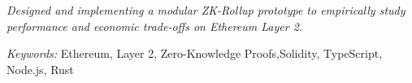 
\nointent
\textit{Designed and implementing a modular ZK-Rollup prototype to empirically study performance and economic trade-offs on Ethereum Layer 2.} 

\nointent
\textit{Keywords:} Ethereum, Layer 2, Zero-Knowledge Proofs,Solidity, TypeScript, Node.js, Rust
